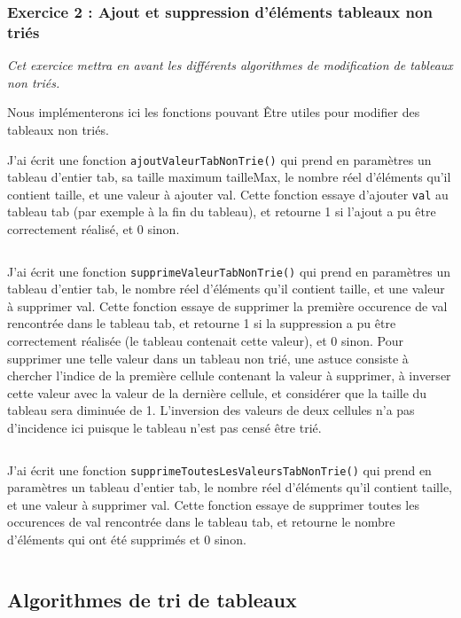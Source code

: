\subsubsection{Exercice 2 : Ajout et suppression d'éléments tableaux non triés}
\textit{Cet exercice mettra en avant les différents algorithmes de modification de tableaux non triés.}

Nous implémenterons ici les fonctions pouvant Être utiles pour modifier des tableaux non triés.

J'ai écrit une fonction \texttt{ajoutValeurTabNonTrie()} qui prend en paramètres un tableau d’entier tab, sa taille maximum tailleMax, le nombre réel d’éléments qu’il contient taille, et une valeur à ajouter val. Cette fonction essaye d’ajouter \texttt{val} au tableau tab (par exemple à la fin du tableau), et retourne 1 si l’ajout a pu être correctement réalisé, et 0 sinon.
\inputminted[linenos,firstline=7, lastline=13]{cpp}{../sources/cpp/TP1-2/modifTableauxNonTries.c}

J'ai écrit une fonction \texttt{supprimeValeurTabNonTrie()} qui prend en paramètres un tableau d’entier tab, le nombre réel d’éléments qu’il contient taille, et une valeur à supprimer val. Cette fonction essaye de supprimer la première occurence de val rencontrée dans le tableau tab, et retourne 1 si la suppression a pu être correctement réalisée (le tableau contenait cette valeur), et 0 sinon. Pour supprimer une telle valeur dans un tableau non trié, une astuce consiste à chercher l’indice de la première cellule contenant la valeur à supprimer, à inverser cette valeur avec la valeur de la dernière cellule, et considérer que la taille du tableau sera diminuée de 1. L’inversion des valeurs de deux cellules n’a pas d’incidence ici puisque le tableau n’est pas censé être trié.
\inputminted[linenos,firstline=15, lastline=27]{cpp}{../sources/cpp/TP1-2/modifTableauxNonTries.c}

J'ai écrit une fonction \texttt{supprimeToutesLesValeursTabNonTrie()} qui prend en paramètres un tableau d’entier tab, le nombre réel d’éléments qu’il contient taille, et une valeur à supprimer val. Cette fonction essaye de supprimer toutes les occurences de val rencontrée dans le tableau tab, et retourne le nombre d’éléments qui ont été supprimés et 0 sinon.
\inputminted[linenos,firstline=29, lastline=35]{cpp}{../sources/cpp/TP1-2/modifTableauxNonTries.c}

\subsection{Algorithmes de tri de tableaux}
